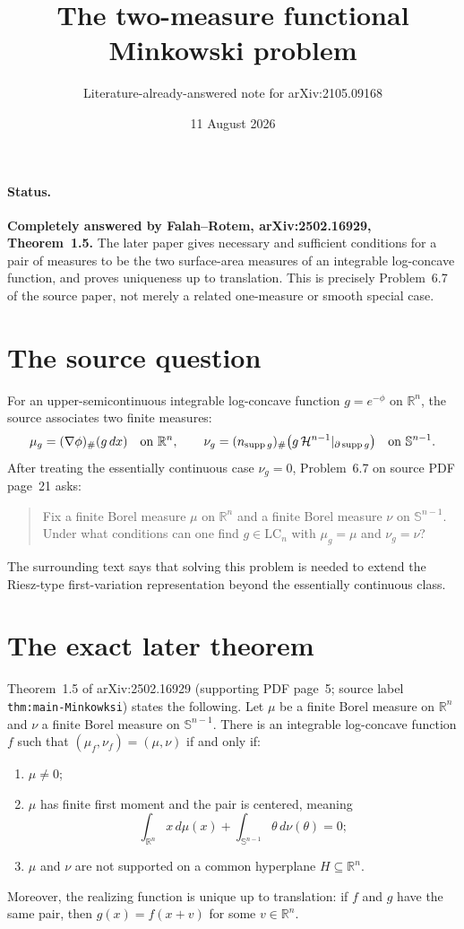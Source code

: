 \documentclass[11pt]{article}
\title{The two-measure functional Minkowski problem}
\author{Literature-already-answered note for arXiv:2105.09168}
\date{11 August 2026}
\newcommand{\R}{\mathbb R}
\newcommand{\Sph}{\mathbb S}
\newcommand{\LC}{\mathrm{LC}}
\begin{document}
\maketitle

\paragraph{Status.}
\textbf{Completely answered by Falah--Rotem, arXiv:2502.16929,
Theorem~1.5.}
The later paper gives necessary and sufficient conditions for a pair of
measures to be the two surface-area measures of an integrable log-concave
function, and proves uniqueness up to translation.  This is precisely
Problem~6.7 of the source paper, not merely a related one-measure or smooth
special case.

\section*{The source question}
For an upper-semicontinuous integrable log-concave function
$g=e^{-\phi}$ on $\R^n$, the source associates two finite measures:
\[
 \mu_g=(\nabla\phi)_{\#}(g\,dx)\quad\hbox{on }\R^n,
 \qquad
 \nu_g=(n_{\operatorname{supp}g})_{\#}
 \bigl(g\,\mathcal H^{n-1}|_{\partial\operatorname{supp}g}\bigr)
 \quad\hbox{on }\Sph^{n-1}.
\]
After treating the essentially continuous case $\nu_g=0$, Problem~6.7 on
source PDF page~21 asks:
\begin{quote}
Fix a finite Borel measure $\mu$ on $\R^n$ and a finite Borel measure
$\nu$ on $\Sph^{n-1}$.  Under what conditions can one find
$g\in\LC_n$ with $\mu_g=\mu$ and $\nu_g=\nu$?
\end{quote}
The surrounding text says that solving this problem is needed to extend the
Riesz-type first-variation representation beyond the essentially continuous
class.

\section*{The exact later theorem}
Theorem~1.5 of arXiv:2502.16929 (supporting PDF page~5; source label
\texttt{thm:main-Minkowksi}) states the following.  Let $\mu$ be a finite
Borel measure on $\R^n$ and $\nu$ a finite Borel measure on
$\Sph^{n-1}$.  There is an integrable log-concave function $f$ such that
$(\mu_f,\nu_f)=(\mu,\nu)$ if and only if:
\begin{enumerate}
\item $\mu\ne0$;
\item $\mu$ has finite first moment and the pair is centered, meaning
\[
 \int_{\R^n}x\,d\mu(x)+
 \int_{\Sph^{n-1}}\theta\,d\nu(\theta)=0;
\]
\item $\mu$ and $\nu$ are not supported on a common hyperplane
$H\subseteq\R^n$.
\end{enumerate}
Moreover, the realizing function is unique up to translation: if $f$ and
$g$ have the same pair, then $g(x)=f(x+v)$ for some $v\in\R^n$.
\end{document}
